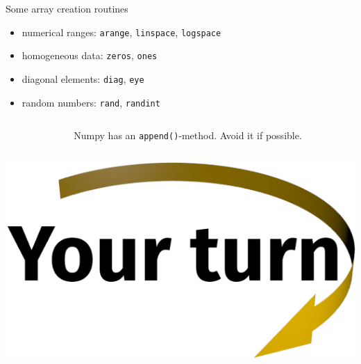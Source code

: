 \documentclass[svgnames]{beamer}
\begin{document}
\begin{frame}{Some array creation routines}

 \begin{itemize}
  \item numerical ranges:
        \texttt{arange}, \texttt{linspace}, \texttt{logspace}
  \item homogeneous data:
        \texttt{zeros}, \texttt{ones}
  \item diagonal elements:
        \texttt{diag}, \texttt{eye}
  \item random numbers:
        \texttt{rand}, \texttt{randint}
 \end{itemize}

 \vspace{0.3truecm}
 \begin{columns}
  \begin{column}{0.02\textwidth}
   \alert{\raisebox{1.0em}{\dbend}}
  \end{column}%
  \begin{column}{0.98\textwidth}
   \alert{Numpy has an \texttt{append()}-method. Avoid it if possible.}
  \end{column}
 \end{columns}

 \vspace{0.3truecm}
 \begin{center}
  \includegraphics[width=3truecm]{yourturn}
 \end{center}
\end{frame}
\end{document}
